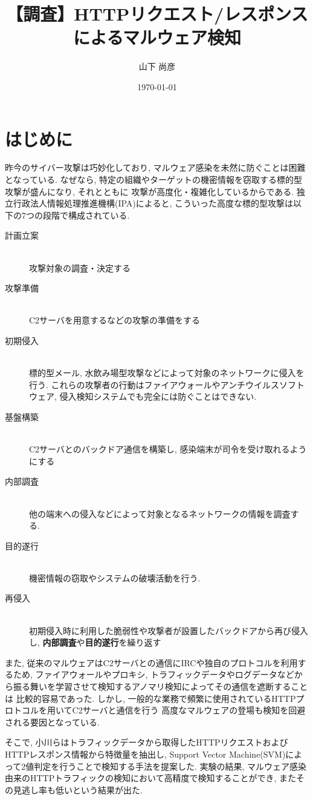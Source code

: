 \documentclass[twocolumn,10pt]{ltjsarticle}
\title{【調査】HTTPリクエスト/レスポンスによるマルウェア検知}
\author{山下 尚彦}
\date{\today}
\begin{document}
\maketitle

\section{はじめに}
昨今のサイバー攻撃は巧妙化しており, マルウェア感染を未然に防ぐことは困難となっている. 
なぜなら, 特定の組織やターゲットの機密情報を窃取する標的型攻撃が盛んになり, それとともに
攻撃が高度化・複雑化しているからである. 独立行政法人情報処理推進機構(IPA)によると, 
こういった高度な標的型攻撃は以下の7つの段階で構成されている\cite{IPA2014高度標的型攻撃}. 

\begin{description}
    \item[計画立案]~\\
    攻撃対象の調査・決定する

    \item[攻撃準備]~\\
    C2サーバを用意するなどの攻撃の準備をする 

    \item[初期侵入]~\\
    標的型メール, 水飲み場型攻撃などによって対象のネットワークに侵入を行う. 
    これらの攻撃者の行動はファイアウォールやアンチウイルスソフトウェア, 侵入検知システムでも完全には防ぐことはできない. 
    
    \item[基盤構築]~\\
    C2サーバとのバックドア通信を構築し, 感染端末が司令を受け取れるようにする

    \item[内部調査]~\\
    他の端末への侵入などによって対象となるネットワークの情報を調査する. 

    \item[目的遂行]~\\
    機密情報の窃取やシステムの破壊活動を行う. 

    \item[再侵入]~\\ 
    初期侵入時に利用した脆弱性や攻撃者が設置したバックドアから再び侵入し, 
    \textbf{内部調査}や\textbf{目的遂行}を繰り返す
\end{description}

また, 従来のマルウェアはC2サーバとの通信にIRCや独自のプロトコルを利用するため, ファイアウォールやプロキシ, 
トラフィックデータやログデータなどから振る舞いを学習させて検知するアノマリ検知によってその通信を遮断することは
比較的容易であった. しかし, 一般的な業務で頻繁に使用されているHTTPプロトコルを用いてC2サーバと通信を行う
高度なマルウェアの登場も検知を回避される要因となっている. \par
そこで, 小川らはトラフィックデータから取得したHTTPリクエストおよびHTTPレスポンス情報から特徴量を抽出し, 
Support Vector Machine(SVM)によって2値判定を行うことで検知する手法を提案した\cite{小川秀貴2016リクエスト間隔}. 
実験の結果, マルウェア感染由来のHTTPトラフィックの検知において高精度で検知することができ, 
またその見逃し率も低いという結果が出た. 
\end{document}
